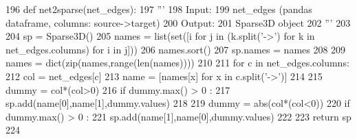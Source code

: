 \begin{DoxyCode}
196 \textcolor{keyword}{def }net2sparse(net\_edges):
197     \textcolor{stringliteral}{'''}
198 \textcolor{stringliteral}{    Input:}
199 \textcolor{stringliteral}{        net\_edges (pandas dataframe, columns: source->target)}
200 \textcolor{stringliteral}{    Output:}
201 \textcolor{stringliteral}{        Sparse3D object}
202 \textcolor{stringliteral}{    '''}
203 
204     sp = Sparse3D()
205     names = list(set([i \textcolor{keywordflow}{for} j \textcolor{keywordflow}{in} (k.split(\textcolor{stringliteral}{'->'}) \textcolor{keywordflow}{for} k \textcolor{keywordflow}{in} net\_edges.columns) \textcolor{keywordflow}{for} i \textcolor{keywordflow}{in} j]))
206     names.sort()
207     sp.names = names
208 
209     names = dict(zip(names,range(len(names))))
210 
211     \textcolor{keywordflow}{for} c \textcolor{keywordflow}{in} net\_edges.columns:
212         col = net\_edges[c]
213         name = [names[x] \textcolor{keywordflow}{for} x \textcolor{keywordflow}{in} c.split(\textcolor{stringliteral}{'->'})]
214 
215         dummy = col*(col>0)
216         \textcolor{keywordflow}{if} dummy.max() > 0 :
217             sp.add(name[0],name[1],dummy.values)
218 
219         dummy = abs(col*(col<0))
220         \textcolor{keywordflow}{if} dummy.max() > 0 :
221             sp.add(name[1],name[0],dummy.values)
222 
223     \textcolor{keywordflow}{return} sp
224 \end{DoxyCode}
